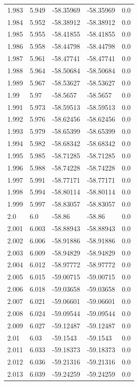 \begin{tabular}{lllll}
1.983 & 5.949 & -58.35969 & -58.35969 & 0.0 \\
1.984 & 5.952 & -58.38912 & -58.38912 & 0.0 \\
1.985 & 5.955 & -58.41855 & -58.41855 & 0.0 \\
1.986 & 5.958 & -58.44798 & -58.44798 & 0.0 \\
1.987 & 5.961 & -58.47741 & -58.47741 & 0.0 \\
1.988 & 5.964 & -58.50684 & -58.50684 & 0.0 \\
1.989 & 5.967 & -58.53627 & -58.53627 & 0.0 \\
1.99 & 5.97 & -58.5657 & -58.5657 & 0.0 \\
1.991 & 5.973 & -58.59513 & -58.59513 & 0.0 \\
1.992 & 5.976 & -58.62456 & -58.62456 & 0.0 \\
1.993 & 5.979 & -58.65399 & -58.65399 & 0.0 \\
1.994 & 5.982 & -58.68342 & -58.68342 & 0.0 \\
1.995 & 5.985 & -58.71285 & -58.71285 & 0.0 \\
1.996 & 5.988 & -58.74228 & -58.74228 & 0.0 \\
1.997 & 5.991 & -58.77171 & -58.77171 & 0.0 \\
1.998 & 5.994 & -58.80114 & -58.80114 & 0.0 \\
1.999 & 5.997 & -58.83057 & -58.83057 & 0.0 \\
2.0 & 6.0 & -58.86 & -58.86 & 0.0 \\
2.001 & 6.003 & -58.88943 & -58.88943 & 0.0 \\
2.002 & 6.006 & -58.91886 & -58.91886 & 0.0 \\
2.003 & 6.009 & -58.94829 & -58.94829 & 0.0 \\
2.004 & 6.012 & -58.97772 & -58.97772 & 0.0 \\
2.005 & 6.015 & -59.00715 & -59.00715 & 0.0 \\
2.006 & 6.018 & -59.03658 & -59.03658 & 0.0 \\
2.007 & 6.021 & -59.06601 & -59.06601 & 0.0 \\
2.008 & 6.024 & -59.09544 & -59.09544 & 0.0 \\
2.009 & 6.027 & -59.12487 & -59.12487 & 0.0 \\
2.01 & 6.03 & -59.1543 & -59.1543 & 0.0 \\
2.011 & 6.033 & -59.18373 & -59.18373 & 0.0 \\
2.012 & 6.036 & -59.21316 & -59.21316 & 0.0 \\
2.013 & 6.039 & -59.24259 & -59.24259 & 0.0 \\

\end{tabular}
